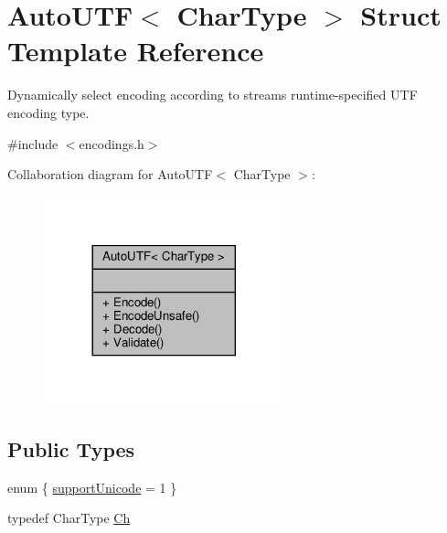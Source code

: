 \hypertarget{structAutoUTF}{}\section{Auto\+U\+TF$<$ Char\+Type $>$ Struct Template Reference}
\label{structAutoUTF}


Dynamically select encoding according to stream\textquotesingle{}s runtime-\/specified U\+TF encoding type.  




{\ttfamily \#include $<$encodings.\+h$>$}



Collaboration diagram for Auto\+U\+TF$<$ Char\+Type $>$\+:
\nopagebreak
\begin{figure}[H]
\begin{center}
\leavevmode
\includegraphics[width=197pt]{structAutoUTF__coll__graph}
\end{center}
\end{figure}
\subsection*{Public Types}
\begin{DoxyCompactItemize}
\item 
enum \{ \hyperlink{structAutoUTF_ac046404cf4770f29218ada39f6b652d3adc86ae046cd64f591495ac635a5c04c2}{support\+Unicode} = 1
 \}
\item 
typedef Char\+Type \hyperlink{structAutoUTF_a0609343de776df3bc31b4c980eb3cf1c}{Ch}
\end{DoxyCompactItemize}
